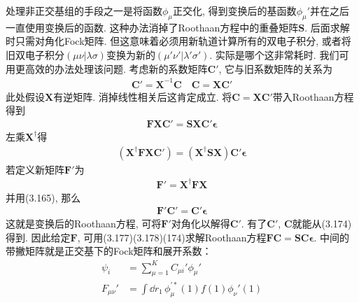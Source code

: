 处理非正交基组的手段之一是将函数${\phi_\mu}$正交化, 
得到变换后的基函数$\phi_\mu'$并在之后一直使用变换后的函数. 
这种办法消掉了Roothaan方程中的重叠矩阵$\mathbf{S}$. 
后面求解时只需对角化Fock矩阵. 
但这意味着必须用新轨道计算所有的双电子积分, 
或者将旧双电子积分$(\mu\nu|\lambda\sigma)$变换为新的$(\mu'\nu'|\lambda'\sigma')$. 
实际是哪个这非常耗时. 
我们可用更高效的办法处理该问题. 
考虑新的系数矩阵$\mathbf{C}'$, 
它与旧系数矩阵的关系为
\begin{align}
	\mathbf{C'=X}^{-1}\mathbf{C}\quad \mathbf{C=XC'}
\end{align}
此处假设$\mathbf{X}$有逆矩阵. 
消掉线性相关后这肯定成立. 
将$\mathbf{C=XC'}$带入Roothaan方程得到
\begin{align}
	\mathbf{FXC'=SXC'}\bm{\epsilon}
\end{align} 
左乘$\mathbf{X^\dagger}$得
\begin{align}
	(\mathbf{X^\dagger FX}\mathbf{C'}) = (\mathbf{X^\dagger SX})\mathbf{C'}\bm{\epsilon}
\end{align}
若定义新矩阵$\mathbf{F}'$为
\begin{align}
	\mathbf{F'=X^\dagger FX}
\end{align}
并用(3.165), 
那么
\begin{align}
	\mathbf{F'C'=C'}\bm{\epsilon}
\end{align}
这就是变换后的Roothaan方程, 
可将$\mathbf{F'}$对角化以解得$\mathbf{C'}$. 
有了$\mathbf{C'}$, 
$\mathbf{C}$就能从(3.174)得到. 
因此给定$\mathbf{F}$, 
可用(3.177)(3.178)(174)求解Roothaan方程$\mathbf{FC=SC}\bm{\epsilon}$. 
中间的带撇矩阵就是正交基下的Fock矩阵和展开系数：
\begin{align}
	\psi_i & = \sum_{\mu=1}^{K}C_{\mu i}'\phi_\mu'\\
	F_{\mu\nu}' & = \int\dd{r}_1\,\phi^{\prime*}_\mu(1)f(1)\phi_\nu'(1)
\end{align}
